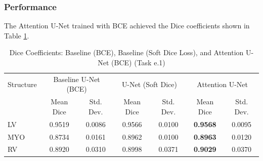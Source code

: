 \documentclass{article}
\begin{document}
\subsubsection{Performance}
The Attention U-Net trained with BCE achieved the Dice coefficients shown in Table \ref{tab:attention_unet_comparison}.
\begin{table}[H]
  \centering
  \caption{Dice Coefficients: Baseline (BCE), Baseline (Soft Dice Loss), and Attention U-Net (BCE) (Task e.1)}
  \label{tab:attention_unet_comparison}
  \begin{tabular}{l|cc|cc|cc}
    \toprule
    Structure & \multicolumn{2}{c|}{Baseline U-Net (BCE)} & \multicolumn{2}{c|}{U-Net (Soft Dice)} & \multicolumn{2}{c}{Attention U-Net}                                           \\
              & Mean Dice                                 & Std. Dev.                              & Mean Dice                           & Std. Dev. & Mean Dice       & Std. Dev. \\
    \midrule
    LV        & 0.9519                                    & 0.0086                                 & 0.9566                              & 0.0100    & \textbf{0.9568} & 0.0095    \\
    MYO       & 0.8734                                    & 0.0161                                 & 0.8962                              & 0.0100    & \textbf{0.8963} & 0.0120    \\
    RV        & 0.8920                                    & 0.0310                                 & 0.8998                              & 0.0371    & \textbf{0.9029} & 0.0370    \\
    \bottomrule
  \end{tabular}
\end{table}
\end{document}
